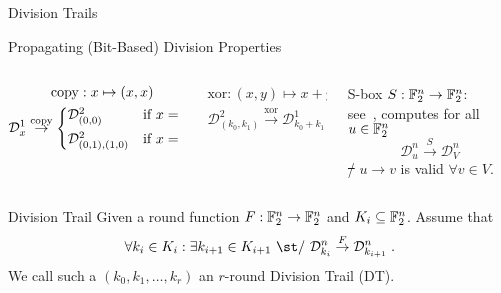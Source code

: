 \begin{frame}{Division Trails}
    \begin{block}{Propagating (Bit-Based) Division Properties}
        \vspace*{5pt}
        \begin{columns}
        \begin{column}{0.3\textwidth}
            \vspace*{-10pt}
            \begin{gather*}
                \mathrm{copy} : x \mapsto (x, x) \\
                \mathcal{D}^1_x \stackrel{\mathrm{copy}}{\to} \begin{cases*}
                    \mathcal{D}^2_{(0,0)}       & if $x = 0$ \\
                    \mathcal{D}^2_{(0,1),(1,0)} & if $x = 1$
                \end{cases*}
            \end{gather*}
            \vspace*{-3pt}
        \end{column}
        \begin{column}{0.3\textwidth}
            \vspace*{-10pt}
            \begin{gather*}
                \mathrm{xor} : (x,y) \mapsto x + y \\
                \mathcal{D}^{2}_{(k_0,k_1)} \stackrel{\mathrm{xor}}{\to} \mathcal{D}^1_{k_0+k_1}
            \end{gather*}
        \end{column}
        \pause
        \begin{column}{0.3\textwidth}
            \centering
            S-box $S : \mathbb{F}_2^n \to \mathbb{F}_2^n$:\\
            see~\cite[Algorithm~2]{AC:XZBL16},
            computes for all $u \in \mathbb{F}_2^n$\\
            \vspace*{-15pt}
            \begin{equation*}
                \mathcal{D}^{n}_{u} \stackrel{S}{\to} \mathcal{D}^{n}_V
            \end{equation*}
            \st/ $u \to v$ is valid $\forall v \in V$.
        \end{column}
        \end{columns}
        \vspace*{5pt}
    \end{block}
    \pause
    \begin{block}{Division Trail}
        Given a round function $F : \mathbb{F}_2^n \to \mathbb{F}_2^n$ and $K_i \subseteq \mathbb{F}_2^n$.
        Assume that
        \begin{equation*}
            \forall k_i \in K_i: \exists k_{i+1} \in K_{i+1}\ \text{\st/}\ \mathcal{D}^n_{k_i} \stackrel{F}{\to} \mathcal{D}^n_{k_{i+1}}\;.
        \end{equation*}
        We call such a $(k_0, k_1, \ldots, k_r)$ an $r$-round Division Trail (DT).
    \end{block}
\end{frame}

